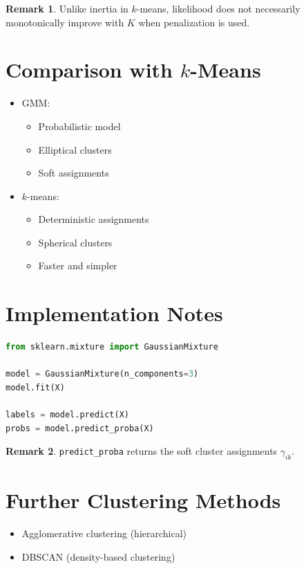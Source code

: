 \documentclass[12pt,oneside]{book}
\numberwithin{equation}{section}
\theoremstyle{definition}
\newtheorem{remark}{Remark}[section]
\theoremstyle{plain}
\theoremstyle{remark}
\begin{document}
\begin{remark}
Unlike inertia in $k$-means, likelihood does not necessarily monotonically improve with $K$ when penalization is used.
\end{remark}

\section{Comparison with $k$-Means}

\begin{itemize}
    \item GMM:
    \begin{itemize}
        \item Probabilistic model
        \item Elliptical clusters
        \item Soft assignments
    \end{itemize}
    \item $k$-means:
    \begin{itemize}
        \item Deterministic assignments
        \item Spherical clusters
        \item Faster and simpler
    \end{itemize}
\end{itemize}

\section{Implementation Notes}

\begin{lstlisting}[language=Python]
from sklearn.mixture import GaussianMixture

model = GaussianMixture(n_components=3)
model.fit(X)

labels = model.predict(X)
probs = model.predict_proba(X)
\end{lstlisting}

\begin{remark}
\texttt{predict\_proba} returns the soft cluster assignments $\gamma_{ik}$.
\end{remark}

\section{Further Clustering Methods}

\begin{itemize}
    \item Agglomerative clustering (hierarchical)
    \item DBSCAN (density-based clustering)
\end{itemize}
\end{document}
